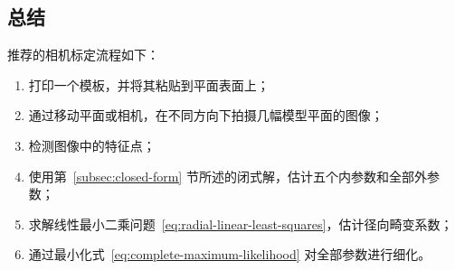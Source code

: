 \subsection{总结}\label{subsec:calibration-summary}

推荐的相机标定流程如下：
\begin{enumerate}
    \item 打印一个模板，并将其粘贴到平面表面上；
    \item 通过移动平面或相机，在不同方向下拍摄几幅模型平面的图像；
    \item 检测图像中的特征点；
    \item 使用第~\ref{subsec:closed-form} 节所述的闭式解，估计五个内参数和全部外参数；
    \item 求解线性最小二乘问题~\eqref{eq:radial-linear-least-squares}，估计径向畸变系数；
    \item 通过最小化式~\eqref{eq:complete-maximum-likelihood} 对全部参数进行细化。
\end{enumerate}
